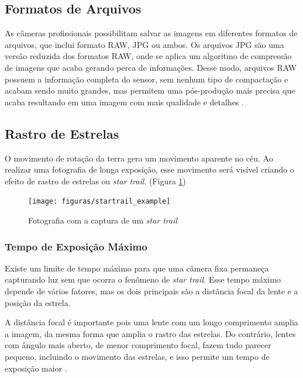 \subsection{Formatos de Arquivos}

As câmeras profissionais possibilitam salvar as imagens em diferentes formatos de arquivos, que inclui formato RAW, JPG ou ambos. Os arquivos JPG são uma versão reduzida dos formatos RAW, onde se aplica um algoritmo de compressão de imagens que acaba gerando perca de informações. Desse modo, arquivos RAW possuem a informação completa do sensor, sem nenhum tipo de compactação e acabam sendo muito grandes, mas permitem uma pós-produção mais precisa que acaba resultando em uma imagem com mais qualidade e detalhes \cite{book:bbcsky}.

\subsection{Rastro de Estrelas}

O movimento de rotação da terra gera um movimento aparente no céu. Ao realizar uma fotografia de longa exposição, esse movimento será visível criando o efeito de rastro de estrelas ou \textit{star trail}. (Figura \ref{fig:startrail_example})

\begin{figure}[!htb]
	\centering
	\caption{Fotografia com a captura de um \textit{star trail}}
	\texttt{[image: figuras/startrail\_example]}
	\label{fig:startrail_example}
\end{figure}

\subsubsection{Tempo de Exposição Máximo}
\label{sec:TempoMax}

Existe um limite de tempo máximo para que uma câmera fixa permaneça capturando luz sem que ocorra o fenômeno de \textit{star trail}. Esse tempo máximo depende de vários fatores, mas os dois principais são a distância focal da lente e a posição da estrela.

A distância focal é importante pois uma lente com um longo comprimento amplia a imagem, da mesma forma que amplia o rastro das estrelas. Do contrário, lentes com ângulo mais aberto, de menor comprimento focal, fazem tudo parecer pequeno, incluindo o movimento das estrelas, e isso permite um tempo de exposição maior \cite{book:astrophotographyAmateur}.

